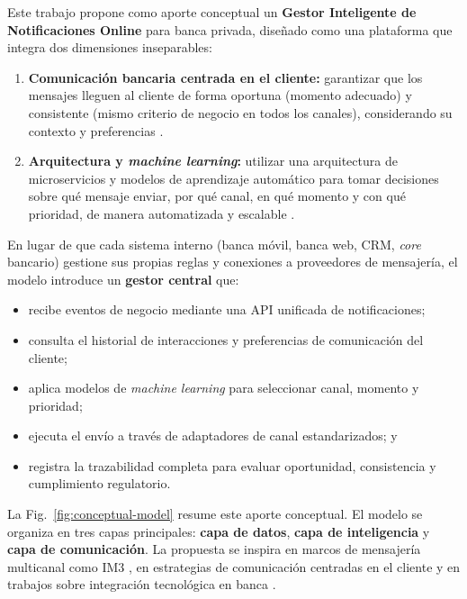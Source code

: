 \documentclass[conference]{IEEEtran}
\begin{document}
Este trabajo propone como aporte conceptual un \textbf{Gestor Inteligente de Notificaciones Online} para banca privada, dise{\~n}ado como una plataforma que integra dos dimensiones inseparables:

\begin{enumerate}
  \item \textbf{Comunicaci{\'o}n bancaria centrada en el cliente:} garantizar que los mensajes lleguen al cliente de forma oportuna (momento adecuado) y consistente (mismo criterio de negocio en todos los canales), considerando su contexto y preferencias \cite{torres2020,alzahrani2020}.
  \item \textbf{Arquitectura y \textit{machine learning}:} utilizar una arquitectura de microservicios y modelos de aprendizaje autom{\'a}tico para tomar decisiones sobre qu{\'e} mensaje enviar, por qu{\'e} canal, en qu{\'e} momento y con qu{\'e} prioridad, de manera automatizada y escalable \cite{rahimi2021,salami2022}.
\end{enumerate}

En lugar de que cada sistema interno (banca m{\'o}vil, banca web, CRM, \textit{core} bancario) gestione sus propias reglas y conexiones a proveedores de mensajer{\'i}a, el modelo introduce un \textbf{gestor central} que:
\begin{itemize}
  \item recibe eventos de negocio mediante una API unificada de notificaciones;
  \item consulta el historial de interacciones y preferencias de comunicaci{\'o}n del cliente;
  \item aplica modelos de \textit{machine learning} para seleccionar canal, momento y prioridad;
  \item ejecuta el env{\'i}o a trav{\'e}s de adaptadores de canal estandarizados; y
  \item registra la trazabilidad completa para evaluar oportunidad, consistencia y cumplimiento regulatorio.
\end{itemize}

La Fig.~\ref{fig:conceptual-model} resume este aporte conceptual. El modelo se organiza en tres capas principales: \textbf{capa de datos}, \textbf{capa de inteligencia} y \textbf{capa de comunicaci{\'o}n}. La propuesta se inspira en marcos de mensajer{\'i}a multicanal como IM3 \cite{liang2011,liu2011}, en estrategias de comunicaci{\'o}n centradas en el cliente \cite{torres2020} y en trabajos sobre integraci{\'o}n tecnol{\'o}gica en banca \cite{rahimi2021}.
\end{document}
